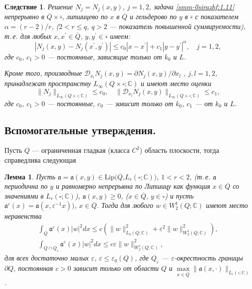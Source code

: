 \documentclass[a4paper,12pt]{article}
\newtheorem{corollary}{Следствие}[theorem]
\newtheorem{lemma}[theorem]{Лемма}
\theoremstyle{definition}
\begin{document}
\begin{corollary}
{Решение $N_j=N_j(x,y)$, $j=1,2$, задачи \eqref{smm-0sirazhf:1.11} непрерывно в $\overline{Q}\times\overline\square$,
	липшицево по $x$ в $\overline{Q}$ и гельдерово по $y$ в $\overline\square$ с показателем $\alpha=(r-2)/r$,
	($2<r\leqslant q$,  $q>2$ --- показатель повышенной суммируемости), т.\,е. для любых
	$x, x^\prime \in \overline{Q}$,  $y, y^\prime \in \overline\square$ имеем:}
\begin{equation}\label{smm-0sirazhdf:1.18}
	|N_j(x,y)-N_j(x^\prime,y^\prime)|\leqslant c_0|x-x^\prime|+c_1|y-y^\prime|^\alpha, \quad j=1,2,
\end{equation}
{где $c_0$, $c_1>0$ --- постоянные, зависящие только от $k_0$ и $L$.}

{ Кроме того, производные $\mathscr{D}_{x_l} N_j(x,y)={\partial N_j(x,y)}/{\partial x_l}$ , $j,l=1,2$,  принадлежат
	пространству $L_\infty(Q\times\square;\mathbb{C})$  и имеют место оценки}
\begin{equation}\label{smm-0sirazhdf:1.19}
	\|N_j\|_{L_\infty(Q\times\square;\mathbb{C})}\leqslant c_0,\quad \|
	\mathscr{D}_{x_l} N_j(x,y)\|_{L_\infty(Q\times\square;\mathbb{C})} \leqslant c_1,
\end{equation}
{ где $c_0$, $c_1>0$ --- постоянные, $c_0$ --- зависит только от $k_0$, $c_1$ --- от $k_0$ и $L$.}
\end{corollary}

\subsection{Вспомогательные утверждения.}
Пусть $Q$ --- ограниченная гладкая (класса $C^2$) область плоскости,
тогда справедлива следующая

\begin{lemma}
{ Пусть $\mathfrak{a}=\mathfrak{a}(x,y)\in \text{Lip}(\overline{Q}$,$L_r (\square;\mathbb{C}))$, $1<r<2$, (т.\,е. $\mathfrak{a}$  периодична по
	$y$ и равномерно непрерывна  по Липшицу как функция $x\in\overline{Q}$
	со значениями в $L_r (\square;\mathbb{C})$),  $\mathfrak{a}(x,y)\geqslant
	0$, {($x\in\overline{Q}$, $y\in\square$)}  и пусть  $\mathfrak{a}^\varepsilon(x)
	=\mathfrak{a}(x,\varepsilon^{-1} x))$, $x\in\overline{Q}$. Тогда для
	любого $w\in W_2^1 (Q;\mathbb{C})$ имеют место неравенства
	\begin{gather}\label{smm-0sirazhVf:1}
		\int_Q\mathfrak{a}^\varepsilon(x) |w|^2 dx\leqslant c\left(\|w\|_{L_2 (Q;\mathbb{C})}^2+
		\varepsilon^2 \|w\|_{W_2^1 (Q;\mathbb C)}^2 \right),  \\\label{smm-0sirazhVf:2}
		\int_{Q\cap Q_\varepsilon}\mathfrak{a}^\varepsilon(x) |w|^2 dx\leqslant c\varepsilon\|w\|_{W_2^1 (Q;\mathbb{C})}^2,
	\end{gather}
	для всех достаточно малых $\varepsilon$, $\varepsilon\leqslant\varepsilon_0
	(Q)$,
	где $Q_\varepsilon$ --- $\varepsilon$-окрестность границы $\partial Q$,
	постоянная $c>0$ зависит только от области $Q$ и $\mathop{ max}\limits_{x\in\overline{Q}}\|
	\mathfrak{a}(x,\cdot)\|_{L_r (\square;\mathbb C)}$}.
\end{lemma}
\end{document}
